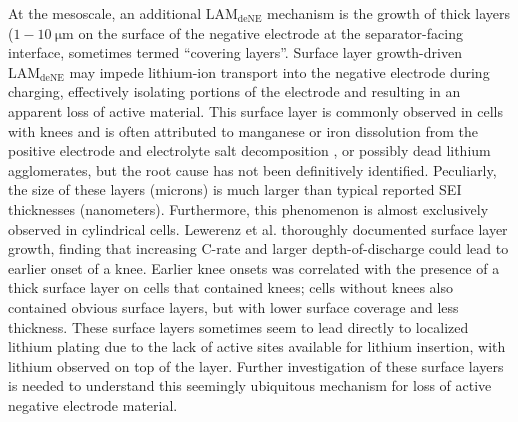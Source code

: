 \documentclass[journal=jpclcd,manuscript=article]{achemso}
\begin{document}
At the mesoscale, an additional $\mathrm{LAM_{deNE}}$ mechanism is the growth of thick layers ($1-10\: \mathrm{\mu m}$ on the surface of the negative electrode at the separator-facing interface, sometimes termed ``covering layers''\cite{lewerenz_post-mortem_2017, lewerenz_systematic_2017, willenberg_development_2020}.
Surface layer growth-driven $\mathrm{LAM_{deNE}}$ may impede lithium-ion transport into the negative electrode during charging, effectively isolating portions of the electrode and resulting in an apparent loss of active material. This surface layer is commonly observed in cells with knees and is often attributed to manganese or iron dissolution from the positive electrode and electrolyte salt decomposition \cite{lewerenz_post-mortem_2017,lewerenz_systematic_2017,zhu_investigation_2021,stiaszny_electrochemical_2014,rahe_nanoscale_2019,keil_linear_2019,sarasketa-zabala_understanding_2015, li_degradation_2016, klett_non-uniform_2014, klett_uneven_2015, willenberg_high-precision_2020, wang_cycle-life_2011}, or possibly dead lithium agglomerates\cite{schindler_fast_2018}, but the root cause has not been definitively identified. Peculiarly, the size of these layers (microns) is much larger than typical reported SEI thicknesses (nanometers)\cite{peled_reviewsei_2017}. Furthermore, this phenomenon is almost exclusively observed in cylindrical cells.
Lewerenz et al.\cite{lewerenz_post-mortem_2017,lewerenz_systematic_2017} thoroughly documented surface layer growth, finding that increasing C-rate and larger depth-of-discharge could lead to earlier onset of a knee. Earlier knee onsets was correlated with the presence of a thick surface layer on cells that contained knees; cells without knees also contained obvious surface layers, but with lower surface coverage and less thickness. These surface layers sometimes seem to lead directly to localized lithium plating due to the lack of active sites available for lithium insertion, with lithium observed on top of the layer.\cite{zhu_investigation_2021}
Further investigation of these surface layers is needed to understand this seemingly ubiquitous mechanism for loss of active negative electrode material.
\end{document}
